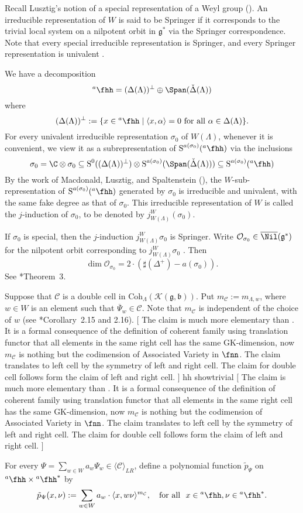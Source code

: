 \documentclass[12pt]{amsart}
\newcommand{\trivial}[2][]{\if\relax\detokenize{#1}\relax
  {%
      \color{orange} \vspace{0em}$[$#2$]$
      \color{black}
  }
  \else
\ifx#1h
\ifcsname showtrivial\endcsname
{%
    \color{orange}\vspace{0em}$[$#2$]$
    \color{black}
}
\fi
\else {\red Wrong argument!} \fi
\fi
}
\def\subset{\subseteq}
\newcommand{\CC}{{\mathcal {C}}}
\newcommand{\CK}{{\mathcal {K}}}
\newcommand{\CO}{{\mathcal {O}}}
\newcommand{\oS}{\operatorname{S}}
\newcommand{\g}{\mathfrak g}
\renewcommand{\b}{\mathfrak b}
\newcommand{\la}{\langle}
\newcommand{\ra}{\rangle}
\numberwithin{equation}{section}
\theoremstyle{remark}
\def\hha{{}^a\fhh}
\def\Coh{\mathrm{Coh}}
\begin{document}
Recall Lusztig's notion of a special representation of a Weyl group  %
(\cite{Lsp}).
An irreducible representation of $W$ is said to be Springer if it corresponds to
the trivial local system on a nilpotent orbit in $\g^*$ via the Springer correspondence.
Note that every special irreducible representation is Springer, and every Springer representation is univalent \cite{BM}.



We have a decomposition
\[
  \hha=(\Delta(\Lambda))^\perp\oplus \Span( \check \Delta(\Lambda))
  \]
where
\[
(\Delta(\Lambda))^\perp:=\{x\in \hha\mid \la x , \alpha \ra=0\textrm{ for all $\alpha\in \Delta(\Lambda)$}\}.
\]
 For every univalent irreducible representation $\sigma_0$ of $W(\Lambda)$, whenever it is convenient, we view it as a subrepresentation of  $\oS^{a(\sigma_0)}(\hha)$ via the inclusions
\[
\sigma_0=  \C\otimes \sigma_0\subset \oS^0((\Delta(\Lambda))^\perp)\otimes \oS^{a(\sigma_0)}(\Span( \check \Delta(\Lambda)))\subset  \oS^{a(\sigma_0)}(\hha)
\]
By the work of Macdonald, Lusztig, and Spaltenstein (\cite[Chapter 11]{Carter}), the $W$-sub-representation of $\oS^{a(\sigma_0)}(\hha)$ generated by $\sigma_0$
is irreducible and univalent, with the same fake degree as that of $\sigma_0$.  This irreducible representation of $W$ is called the $j$-induction of $\sigma_0$, to be denoted by $j_{W(\Lambda)}^W(\sigma_0)$.



If  $\sigma_0$ is special, then the $j$-induction $j_{W(\Lambda)}^W \sigma_0$
is Springer.
Write $\CO_{\sigma_0}\in \overline \Nil(\g^*)$ for the nilpotent orbit corresponding to
$j_{W(\Lambda)}^W \sigma_0$ .
Then
\[
  \dim \CO_{\sigma_0}=2\cdot (\sharp (\Delta^+) - a(\sigma_0)).
\]
See \cite{Ho}*{Theorem~3}.


Suppose that $\CC$ is a double cell in $\Coh_{\Lambda}( \CK(\g,\b))$.
Put $m_\CC:=m_{\Lambda, w}$, where $w\in W$ is an element such that $\overline \Psi_{w}\in \CC$. Note that
$m_\CC$ is independent of the choice of $w$ (see \cite{BV2}*{Corollary~2.15 and 2.16}).\trivial[h]{ The claim is much more elementary than
. It is a formal consequence of the definition of coherent family using translation functor that
all elements in the same right cell has the same GK-dimension,
now $m_\CC$ is nothing but the codimension of Associated Variety in $\fnn$.
The claim translates to left cell by the symmetry of left and right cell.
The claim for double cell follows form the claim of left and right cell.
}
For every $\Psi=\sum_{w\in W} a_{w} \Psi_{w}\in \la \CC\ra_{LR}$, define a polynomial function $\tilde p_\Psi$ on $\hha\times \hha^*$ by
\begin{equation}\label{polynomial00}
  \tilde p_{\Psi}(x,\nu):= \sum_{w\in W} a_{w}\cdot  \la x, w \nu\ra^{m_{\CC}},\quad  \textrm{for all }  \ x\in \hha, \nu\in \hha^*.
\end{equation}
\end{document}
